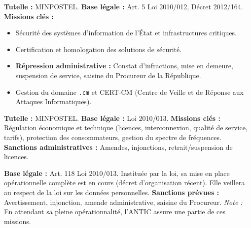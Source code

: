\documentclass[11pt]{article}
\begin{document}
\begin{definition}
    \textbf{Tutelle :} MINPOSTEL. \textbf{Base légale :} Art. 5 Loi 2010/012, Décret 2012/164.
    \textbf{Missions clés :}
    \begin{itemize}
        \item Sécurité des systèmes d'information de l'État et infrastructures critiques.
        \item Certification et homologation des solutions de sécurité.
        \item \textbf{Répression administrative :} Constat d'infractions, mise en demeure, suspension de service, saisine du Procureur de la République.
        \item Gestion du domaine \texttt{.cm} et CERT-CM (Centre de Veille et de Réponse aux Attaques Informatiques).
    \end{itemize}
\end{definition}

\begin{definition}
    \textbf{Tutelle :} MINPOSTEL. \textbf{Base légale :} Loi 2010/013.
    \textbf{Missions clés :} Régulation économique et technique (licences, interconnexion, qualité de service, tarifs), protection des consommateurs, gestion du spectre de fréquences.
    \textbf{Sanctions administratives :} Amendes, injonctions, retrait/suspension de licences.
\end{definition}

\begin{definition}
    \textbf{Base légale :} Art. 118 Loi 2010/013. Instituée par la loi, sa mise en place opérationnelle complète est en cours (décret d'organisation récent). Elle veillera au respect de la loi sur les données personnelles.
    \textbf{Sanctions prévues :} Avertissement, injonction, amende administrative, saisine du Procureur.
    \textit{Note :} En attendant sa pleine opérationnalité, l'ANTIC assure une partie de ces missions.
\end{definition}
\end{document}
